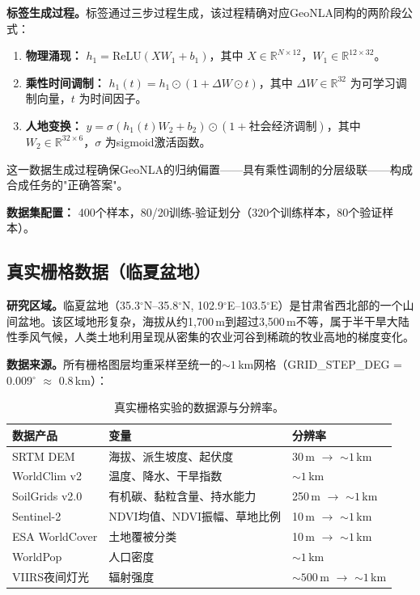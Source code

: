 \documentclass[a4paper,11pt]{article}
\begin{document}
\textbf{标签生成过程。}标签通过三步过程生成，该过程精确对应GeoNLA同构的两阶段公式：

\begin{enumerate}[label=\arabic*.]
    \item \textbf{物理涌现：} $h_1 = \text{ReLU}(X W_1 + b_1)$，其中 $X \in \mathbb{R}^{N \times 12}$，$W_1 \in \mathbb{R}^{12 \times 32}$。
    \item \textbf{乘性时间调制：} $h_1(t) = h_1 \odot (1 + \Delta W \odot t)$，其中 $\Delta W \in \mathbb{R}^{32}$ 为可学习调制向量，$t$ 为时间因子。
    \item \textbf{人地变换：} $y = \sigma(h_1(t) W_2 + b_2) \odot (1 + \text{社会经济调制})$，其中 $W_2 \in \mathbb{R}^{32 \times 6}$，$\sigma$ 为sigmoid激活函数。
\end{enumerate}

这一数据生成过程确保GeoNLA的归纳偏置——具有乘性调制的分层级联——构成合成任务的"正确答案"。

\textbf{数据集配置：} 400个样本，80/20训练-验证划分（320个训练样本，80个验证样本）。

\subsection{真实栅格数据（临夏盆地）}
\label{subsec:real_data}

\textbf{研究区域。}临夏盆地（35.3$^{\circ}$N--35.8$^{\circ}$N, 102.9$^{\circ}$E--103.5$^{\circ}$E）是甘肃省西北部的一个山间盆地。该区域地形复杂，海拔从约1,700\,m到超过3,500\,m不等，属于半干旱大陆性季风气候，人类土地利用呈现从密集的农业河谷到稀疏的牧业高地的梯度变化。

\textbf{数据来源。}所有栅格图层均重采样至统一的${\sim}1$\,km网格（GRID\_STEP\_DEG = 0.009$^{\circ}$ $\approx$ 0.8\,km）：

\begin{table}[htbp]
\centering
\caption{真实栅格实验的数据源与分辨率。}
\label{tab:data_sources}
\begin{tabular}{lll}
\toprule
数据产品 & 变量 & 分辨率 \\
\midrule
SRTM DEM & 海拔、派生坡度、起伏度 & 30\,m $\to$ ${\sim}1$\,km \\
WorldClim v2 & 温度、降水、干旱指数 & ${\sim}1$\,km \\
SoilGrids v2.0 & 有机碳、黏粒含量、持水能力 & 250\,m $\to$ ${\sim}1$\,km \\
Sentinel-2 & NDVI均值、NDVI振幅、草地比例 & 10\,m $\to$ ${\sim}1$\,km \\
ESA WorldCover & 土地覆被分类 & 10\,m $\to$ ${\sim}1$\,km \\
WorldPop & 人口密度 & ${\sim}1$\,km \\
VIIRS夜间灯光 & 辐射强度 & ${\sim}500$\,m $\to$ ${\sim}1$\,km \\
\bottomrule
\end{tabular}
\end{table}
\end{document}

